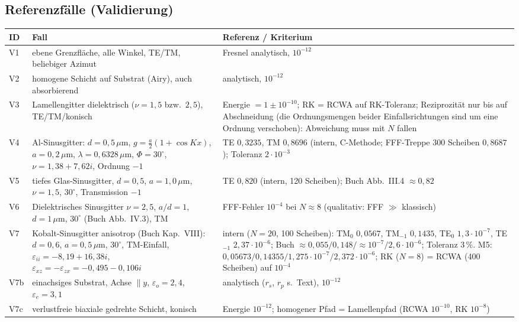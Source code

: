 \subsection{Referenzfälle (Validierung)}
\begin{center}
\small
\begin{tabular}{p{0.6cm}p{6.6cm}p{6.6cm}}
\toprule
ID & Fall & Referenz / Kriterium \\
\midrule
V1 & ebene Grenzfläche, alle Winkel, TE/TM, beliebiger Azimut & Fresnel analytisch, $10^{-12}$ \\
V2 & homogene Schicht auf Substrat (Airy), auch absorbierend & analytisch, $10^{-12}$ \\
V3 & Lamellengitter dielektrisch ($\nu=1{,}5$ bzw.\ $2{,}5$), TE/TM/konisch & Energie $=1\pm10^{-10}$;
     RK = RCWA auf RK-Toleranz; Reziprozität nur bis auf Abschneidung (die Ordnungsmengen beider
     Einfallsrichtungen sind um eine Ordnung verschoben): Abweichung muss mit $N$ fallen \\
V4 & Al-Sinusgitter: $d=0{,}5\,\mu$m, $g=\tfrac a2(1+\cos Kx)$, $a=0{,}2\,\mu$m, $\lambda=0{,}6328\,\mu$m,
     $\Phi=30^\circ$, $\nu=1{,}38+7{,}62i$, Ordnung $-1$ & TE $0{,}3235$, TM $0{,}8696$ (intern, C-Methode;
     FFF-Treppe 300 Scheiben $0{,}8687$); Toleranz $2\cdot10^{-3}$ \\
V5 & tiefes Glas-Sinusgitter, $d=0{,}5$, $a=1{,}0\,\mu$m, $\nu=1{,}5$, $30^\circ$, Transmission $-1$ & TE $0{,}820$
     (intern, 120 Scheiben); Buch Abb.\ III.4 $\approx0{,}82$ \\
V6 & Dielektrisches Sinusgitter $\nu=2{,}5$, $a/d=1$, $d=1\,\mu$m, $30^\circ$ (Buch Abb.\ IV.3), TM &
     FFF-Fehler $10^{-4}$ bei $N\approx8$ (qualitativ: FFF $\gg$ klassisch) \\
V7 & Kobalt-Sinusgitter anisotrop (Buch Kap.\ VIII): $d=0{,}6$, $a=0{,}5\,\mu$m, $30^\circ$, TM-Einfall,
     $\varepsilon_{ii}=-8{,}19+16{,}38i$, $\varepsilon_{xz}=-\varepsilon_{zx}=-0{,}495-0{,}106i$ &
     intern ($N=20$, 100 Scheiben): TM$_0$ $0{,}0567$, TM$_{-1}$ $0{,}1435$, TE$_0$ $1{,}3\cdot10^{-7}$,
     TE$_{-1}$ $2{,}37\cdot10^{-6}$; Buch $\approx0{,}055/0{,}148/\approx10^{-7}/2{,}6\cdot10^{-6}$; Toleranz 3\,\%.
     M5: $0{,}05673/0{,}14355/1{,}275\cdot10^{-7}/2{,}372\cdot10^{-6}$; RK ($N=8$) = RCWA (400 Scheiben) auf $10^{-4}$ \\
V7b & einachsiges Substrat, Achse $\parallel y$, $\varepsilon_o=2{,}4$, $\varepsilon_e=3{,}1$ & analytisch ($r_s$, $r_p$ s.\ Text), $10^{-12}$ \\
V7c & verlustfreie biaxiale gedrehte Schicht, konisch & Energie $10^{-12}$; homogener Pfad = Lamellenpfad (RCWA $10^{-10}$, RK $10^{-8}$) \\

\end{tabular}
\end{center}
